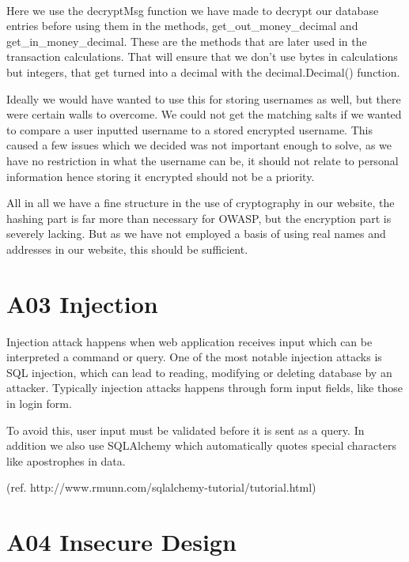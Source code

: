 \paragraph{}
Here we use the decryptMsg function we have made to decrypt our database entries before using them in the methods, get\_out\_money\_decimal and get\_in\_money\_decimal. These are the methods that are later used in the transaction calculations. That will ensure that we don't use bytes in calculations but integers, that get turned into a decimal with the decimal.Decimal() function.

Ideally we would have wanted to use this for storing usernames as well, but there were certain walls to overcome. We could not get the matching salts if we wanted to compare a user inputted username to a stored encrypted username. This caused a few issues which we decided was not important enough to solve, as we have no restriction in what the username can be, it should not relate to personal information hence storing it encrypted should not be a priority. 

All in all we have a fine structure in the use of cryptography in our website, the hashing part is far more than necessary for OWASP, but the encryption part is severely lacking. But as we have not employed a basis of using real names and addresses in our website, this should be sufficient. 

\section{A03 Injection}

Injection attack happens when web application receives input which can be interpreted a command or query. One of the most notable injection attacks is SQL injection, which can lead to reading, modifying or deleting database by an attacker. Typically injection attacks happens through form input fields, like those in login form.

To avoid this, user input must be validated before it is sent as a query. In addition we also use SQLAlchemy which automatically quotes special characters like apostrophes in data.

(ref. http://www.rmunn.com/sqlalchemy-tutorial/tutorial.html) %

\section{A04 Insecure Design}

